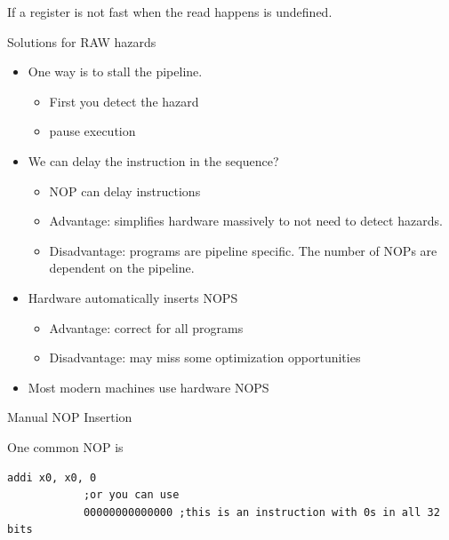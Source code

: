 \documentclass{report}
\begin{document}
\begin{description}
\begin{mdframed}
            If a register is not fast when the read happens
            is undefined.
        \end{mdframed}
    \item Solutions for RAW hazards
        \begin{itemize}
            \item One way is to stall the pipeline.
                \begin{itemize}
                    \item First you detect the hazard
                    \item pause execution
                \end{itemize}
            \item We can delay the instruction in the sequence?
                \begin{itemize}
                    \item NOP can delay instructions
                    \item Advantage: simplifies hardware
                        massively to not need to detect
                        hazards.
                    \item Disadvantage: programs are pipeline
                        specific. The number of NOPs are 
                        dependent on the pipeline.
                \end{itemize}
            \item Hardware automatically inserts NOPS
                \begin{itemize}
                    \item Advantage: correct for all programs
                    \item Disadvantage: may miss some optimization
                        opportunities
                \end{itemize}

            \item Most modern machines use hardware NOPS
        \end{itemize}
    \item Manual NOP Insertion
        \begin{mdframed}
            One common NOP is
            \begin{lstlisting}[language={[x86asm]Assembler}]
            addi x0, x0, 0
            ;or you can use
            00000000000000 ;this is an instruction with 0s in all 32 bits
            \end{lstlisting}
            

\end{mdframed}
\end{description}
\end{document}
